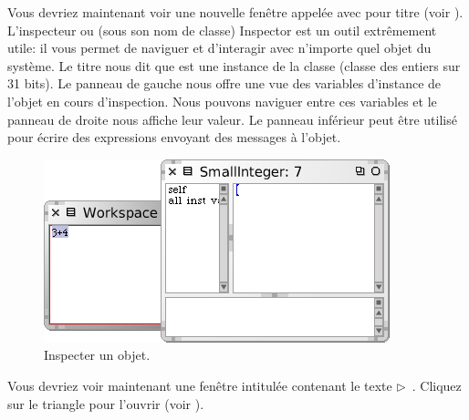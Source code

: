 \documentclass[a4paper,10pt,twoside]{book}
\begin{document}
\noindent
Vous devriez maintenant voir une nouvelle fen\^etre appel\'ee
 avec pour titre 
  (voir ).
L'inspecteur ou (sous son nom de classe) Inspector est un outil
extr\^emement utile: il vous permet de naviguer et d'interagir avec
n'importe quel objet du syst\`eme.
Le titre nous dit que  est une instance de la classe
(classe des entiers sur 31 bits).
Le panneau de gauche nous offre une vue des variables d'instance de
l'objet en cours d'inspection. Nous pouvons naviguer entre ces
variables et le panneau de droite nous affiche leur valeur.
Le panneau inf\'erieur peut \^etre utilis\'e pour \'ecrire des
expressions envoyant des messages \`a l'objet.

\begin{figure}[htb]
\centerline {\includegraphics[scale=0.7]{InspectIt}}
\caption{Inspecter un objet.\label{fig:inspectit}}
\end{figure}



Vous devriez voir maintenant une fen\^etre intitul\'ee 
contenant le texte \mbox{$\triangleright$ }.
Cliquez sur le triangle pour l'ouvrir (voir ).
\end{document}
